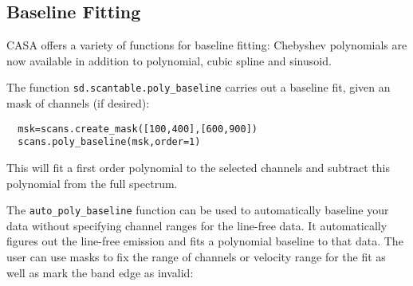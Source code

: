 \subsection{Baseline Fitting}
\label{subsection:sd.asap.BLfitting}

CASA offers a variety of functions for baseline fitting: Chebyshev 
polynomials are now available in addition to polynomial, cubic 
spline and sinusoid. 

The function {\tt sd.scantable.poly\_baseline} carries out a
baseline fit, given an mask of channels (if desired):
\small
\begin{verbatim}
  msk=scans.create_mask([100,400],[600,900])
  scans.poly_baseline(msk,order=1)
\end{verbatim}
\normalsize
This will fit a first order polynomial to the selected channels and
subtract this polynomial from the full spectrum.

The {\tt auto\_poly\_baseline} function can be used to automatically
baseline your data without specifying channel ranges for the
line-free data. It automatically figures out the line-free emission
and fits a polynomial baseline to that data. The user can use masks to
fix the range of channels or velocity range for the fit as well as
mark the band edge as invalid:


